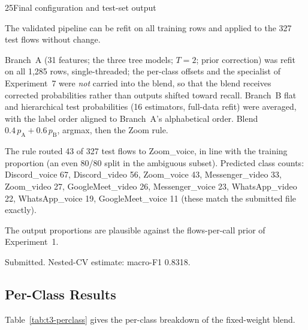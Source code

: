 \begin{explog}{25}{Final configuration and test-set output}
\item[Hypothesis] The validated pipeline can be refit on all training rows and applied to the 327
test flows without change.
\item[Method] Branch~A (31 features; the three tree models; $T=2$; prior correction) was
refit on all 1{,}285 rows, single-threaded; the per-class offsets and the specialist
of Experiment~7 were \emph{not} carried into the blend, so that the blend receives
corrected probabilities rather than outputs shifted toward recall. Branch~B flat and
hierarchical test probabilities (16 estimators, full-data refit) were averaged, with
the label order aligned to Branch~A's alphabetical order. Blend $0.4\,p_\mathrm{A}+0.6\,p_\mathrm{B}$,
argmax, then the Zoom rule.
\item[Result] The rule routed 43 of 327 test flows to Zoom\_voice, in line with the training
proportion (an even 80/80 split in the ambiguous subset). Predicted class counts:
Discord\_voice 67, Discord\_video 56, Zoom\_voice 43, Messenger\_video 33,
Zoom\_video 27, GoogleMeet\_video 26, Messenger\_voice 23, WhatsApp\_video 22,
WhatsApp\_voice 19, GoogleMeet\_voice 11 (these match the submitted file exactly).
\item[Inference] The output proportions are plausible against the flows-per-call prior of
Experiment~1.
\item[Verdict] Submitted. Nested-CV estimate: macro-F1 0.8318.
\end{explog}


\subsection{Per-Class Results}

Table~\ref{tab:t3-perclass} gives the per-class breakdown of the fixed-weight blend.

